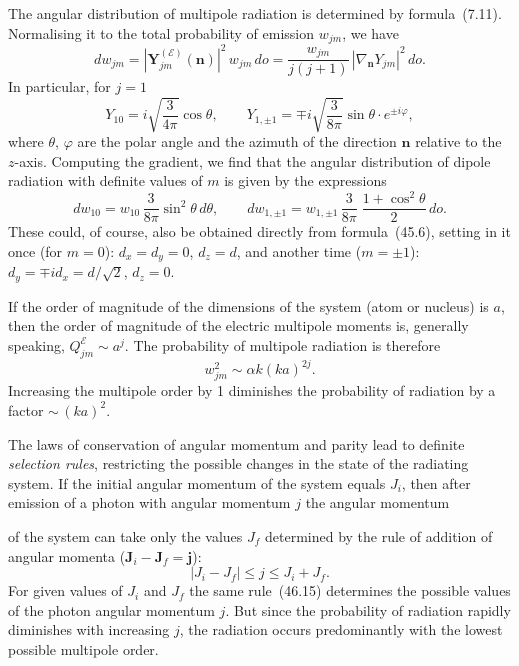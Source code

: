 The angular distribution of multipole radiation is determined by formula~(7.11). Normalising it to the total probability of emission $w_{jm}$, we have
\begin{equation}
dw_{jm} = |\mathbf{Y}^{(\mathscr{E})}_{jm}(\mathbf{n})|^2\,w_{jm}\,do = \frac{w_{jm}}{j(j+1)}\,|\nabla_\mathbf{n} Y_{jm}|^2\,do.
\tag{46.12}
\end{equation}
In particular, for $j = 1$
\[
Y_{10} = i\sqrt{\frac{3}{4\pi}}\cos\theta,\qquad Y_{1,\pm 1} = \mp i\sqrt{\frac{3}{8\pi}}\sin\theta\cdot e^{\pm i\varphi},
\]
where $\theta$, $\varphi$ are the polar angle and the azimuth of the direction $\mathbf{n}$ relative to the $z$-axis. Computing the gradient, we find that the angular distribution of dipole radiation with definite values of $m$ is given by the expressions
\begin{equation}
dw_{10} = w_{10}\,\frac{3}{8\pi}\sin^2\theta\,d\theta,\qquad dw_{1,\pm 1} = w_{1,\pm 1}\,\frac{3}{8\pi}\;\frac{1+\cos^2\theta}{2}\,do.
\tag{46.13}
\end{equation}
These could, of course, also be obtained directly from formula~(45.6), setting in it once (for $m = 0$): $d_x = d_y = 0$, $d_z = d$, and another time ($m = \pm 1$): $d_y = \mp id_x = d/\sqrt{2}$, $d_z = 0$.

If the order of magnitude of the dimensions of the system (atom or nucleus) is $a$, then the order of magnitude of the electric multipole moments is, generally speaking, $Q^{\mathscr{E}}_{jm} \sim a^j$. The probability of multipole radiation is therefore
\begin{equation}
w^2_{jm} \sim \alpha k(ka)^{2j}.
\tag{46.14}
\end{equation}
Increasing the multipole order by 1 diminishes the probability of radiation by a factor ${\sim}\,(ka)^2$.

The laws of conservation of angular momentum and parity lead to definite \textit{selection rules}, restricting the possible changes in the state of the radiating system. If the initial angular momentum of the system equals $J_i$, then after emission of a photon with angular momentum $j$ the angular momentum

of the system can take only the values $J_f$ determined by the rule of addition of angular momenta ($\mathbf{J}_i - \mathbf{J}_f = \mathbf{j}$):
\begin{equation}
|J_i - J_f| \leqslant j \leqslant J_i + J_f.
\tag{46.15}
\end{equation}
For given values of $J_i$ and $J_f$ the same rule~(46.15) determines the possible values of the photon angular momentum $j$. But since the probability of radiation rapidly diminishes with increasing $j$, the radiation occurs predominantly with the lowest possible multipole order.

